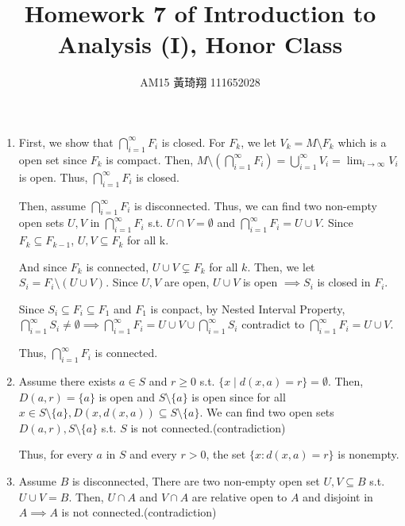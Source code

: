 \documentclass[12pt]{article}
\title{Homework 7 of Introduction to Analysis (I), Honor Class}
\author{AM15 黃琦翔 111652028}
\begin{document}
\maketitle
\begin{enumerate}
    \item First, we show that $\displaystyle\bigcap_{i=1}^{\infty} F_i$ is closed.
    For $F_k$, we let $V_k = M\setminus F_k$ which is a open set since $F_k$ is compact.
    Then, $M \setminus\displaystyle(\bigcap_{i=1}^{\infty} F_i)= \displaystyle\bigcup_{i=1}^{\infty} V_i = \displaystyle\lim_{i\to \infty} V_i$  is open.
    Thus, $\displaystyle\bigcap_{i=1}^{\infty} F_i$ is closed.

    Then, assume $\displaystyle\bigcap_{i=1}^{\infty} F_i$ is disconnected. 
    Thus, we can find two non-empty open sets $U, V$ in $\displaystyle\bigcap_{i=1}^{\infty} F_i$ s.t. $U\cap V = \emptyset$ and $\displaystyle\bigcap_{i=1}^{\infty} F_i = U \cup V$.
    Since $F_k \subseteq F_{k-1}$, $U, V \subseteq F_k$ for all k.

    And since $F_k$ is connected, $U \cup V \subsetneq F_k$ for all $k$.
    Then, we let $S_i  = F_i \setminus (U \cup V)$.
    Since $U, V$ are open, $U \cup V$ is open $\implies S_i$ is closed in $F_i$.

    Since $S_i\subseteq F_i \subseteq F_1$ and $F_1$ is conpact, by Nested Interval Property,
    $\displaystyle\bigcap_{i=1}^{\infty} S_i \neq \emptyset\implies \displaystyle\bigcap_{i=1}^{\infty} F_i = U \cup V \cup \displaystyle\bigcap_{i=1}^{\infty} S_i$ 
    contradict to $\displaystyle\bigcap_{i=1}^{\infty} F_i = U \cup V$.

    Thus, $\displaystyle\bigcap_{i=1}^{\infty} F_i$ is connected.

    \item  Assume there exists $a \in S$ and $r \geq 0$ s.t. $\lbrace x \mid d(x, a) = r\rbrace = \emptyset$.
    Then, $D(a, r) = \lbrace a \rbrace$ is open and $S \setminus \lbrace a \rbrace$ is open 
    since for all $x \in S\setminus\lbrace a \rbrace, D(x, d(x, a)) \subseteq S \setminus\lbrace a \rbrace$.
    We can find two open sets $D(a, r), S \setminus \lbrace a \rbrace$ s.t. $S$ is not connected.(contradiction)

    Thus, for every $a$ in $S$ and every $r > 0$, the set $\lbrace x : d(x, a) = r\rbrace$ is nonempty.

    \newpage
    \item Assume $B$ is disconnected, There are two non-empty open set $U, V\subseteq B$ s.t. $U \cup V = B$.
    Then, $U \cap A$ and $V \cap A$ are relative open to $A$ and disjoint in $A\implies A$ is not connected.(contradiction)


\end{enumerate}
\end{document}
